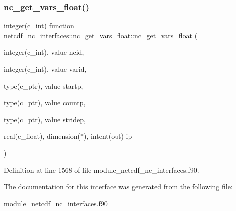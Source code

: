 \subsubsection{\texorpdfstring{nc\+\_\+get\+\_\+vars\+\_\+float()}{nc\_get\_vars\_float()}}
{\footnotesize\ttfamily integer(c\+\_\+int) function netcdf\+\_\+nc\+\_\+interfaces\+::nc\+\_\+get\+\_\+vars\+\_\+float\+::nc\+\_\+get\+\_\+vars\+\_\+float (\begin{DoxyParamCaption}\item[{integer(c\+\_\+int), value}]{ncid,  }\item[{integer(c\+\_\+int), value}]{varid,  }\item[{type(c\+\_\+ptr), value}]{startp,  }\item[{type(c\+\_\+ptr), value}]{countp,  }\item[{type(c\+\_\+ptr), value}]{stridep,  }\item[{real(c\+\_\+float), dimension($\ast$), intent(out)}]{ip }\end{DoxyParamCaption})}



Definition at line 1568 of file module\+\_\+netcdf\+\_\+nc\+\_\+interfaces.\+f90.



The documentation for this interface was generated from the following file\+:\begin{DoxyCompactItemize}
\item 
\hyperlink{module__netcdf__nc__interfaces_8f90}{module\+\_\+netcdf\+\_\+nc\+\_\+interfaces.\+f90}\end{DoxyCompactItemize}
